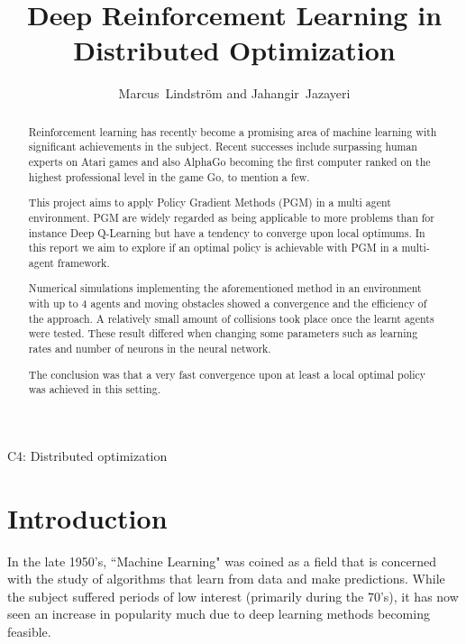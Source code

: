 \documentclass[journal,twoside]{IEEEtran}
\begin{document}
\title{Deep Reinforcement Learning in Distributed Optimization}
\author{Marcus~Lindström and Jahangir~Jazayeri}

%
{C4: Distributed optimization} 
\maketitle

\begin{abstract}
	
Reinforcement learning has recently become a promising area of machine learning with significant achievements in the subject.
Recent successes include surpassing human experts on Atari games and also AlphaGo becoming the first computer ranked on the highest professional level in the game Go, to mention a few.\par
This project aims to apply Policy Gradient Methods (PGM) in a multi agent environment. PGM are widely regarded as being applicable to more problems than for instance Deep Q-Learning but have a tendency to converge upon local optimums. In this report we aim to explore if an optimal policy is achievable with PGM in a multi-agent framework.\par
Numerical simulations implementing the aforementioned method in an environment with up to 4 agents and moving obstacles showed a convergence and the efficiency of the approach. A relatively small amount of collisions took place once the learnt agents were tested. These result differed when changing some parameters such as learning rates and number of neurons in the neural network.\par
The conclusion was that a very fast convergence upon at least a local optimal policy was achieved in this setting.
\end{abstract}

\section{Introduction}

In the late 1950's, ``Machine Learning" was coined as a field that is concerned with the study of
algorithms that learn from data and make predictions. While the subject suffered periods
of low interest (primarily during the 70’s), it has now seen an increase in popularity much due to deep learning methods becoming feasible.
\end{document}

